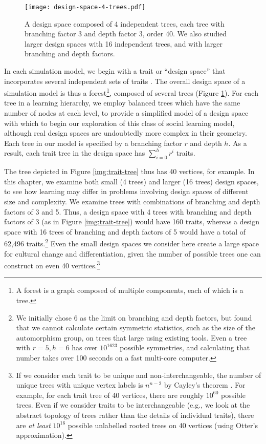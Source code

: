 \documentclass[referee,graybox,natbib]{svmult}
\begin{document}
\begin{figure}[h] 
\centering 
\texttt{[image: design-space-4-trees.pdf]} 
\caption{A design space composed of 4 independent trees, each tree with branching factor 3 and depth factor 3, order 40.  We also studied larger design spaces with 16 independent trees, and with larger branching and depth factors.} 
\label{img:design-space-4} 
\end{figure}

In each simulation model, we begin with a trait or ``design space'' that
incorporates several independent sets of traits \citep{o2010cultural}.
The overall design space of a simulation model is thus a
forest\footnote{A forest is a graph composed of multiple components,
  each of which is a tree.}, composed of several trees (Figure
\ref{img:design-space-4}). For each tree in a learning hierarchy, we
employ balanced trees which have the same number of nodes at each level,
to provide a simplified model of a design space with which to begin our
exploration of this class of social learning model, although real design
spaces are undoubtedly more complex in their geometry. Each tree in our
model is specified by a branching factor $r$ and depth $h$. As a result,
each trait tree in the design space has $\sum_{i=0}^{h} r^i$ traits.

The tree depicted in Figure \ref{img:trait-tree} thus has 40 vertices,
for example. In this chapter, we examine both small (4 trees) and larger
(16 trees) design spaces, to see how learning may differ in problems
involving design spaces of different size and complexity. We examine
trees with combinations of branching and depth factors of 3 and 5. Thus,
a design space with 4 trees with branching and depth factors of 3 (as in
Figure \ref{img:trait-tree}) would have 160 traits, whereas a design
space with 16 trees of branching and depth factors of 5 would have a
total of 62,496 traits.\footnote{We initially chose 6 as the limit on
  branching and depth factors, but found that we cannot calculate
  certain symmetric statistics, such as the size of the automorphism
  group, on trees that large using existing tools. Even a tree with
  $r=5, h=6$ has over $10^{1623}$ possible symmetries, and calculating
  that number takes over 100 seconds on a fast multi-core computer.}
Even the small design spaces we consider here create a large space for
cultural change and differentiation, given the number of possible trees
one can construct on even 40 vertices.\footnote{If we consider each
  trait to be unique and non-interchangeable, the number of unique trees
  with unique vertex labels is $n^{n-2}$ by Cayley's theorem
  \citep{diestel2010graph}. For example, for each trait tree of 40
  vertices, there are roughly $10^{60}$ possible trees. Even if we
  consider traits to be interchangeable (e.g., we look at the abstract
  topology of trees rather than the details of individual traits), there
  are \emph{at least} $10^{16}$ possible unlabelled rooted trees on 40
  vertices (using Otter's \citeyearpar{otter1948number} approximation).}
\end{document}
